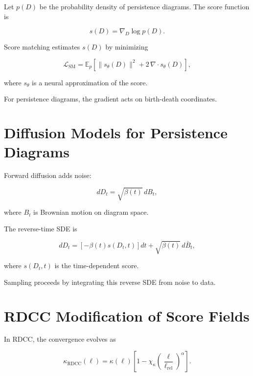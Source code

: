 \documentclass[11pt,a4paper]{article}
\begin{document}
Let $p(D)$ be the probability density of persistence diagrams. The score function 
is

\begin{equation}
    s(D)
    = \nabla_{D} \log p(D).
\end{equation}

Score matching estimates $s(D)$ by minimizing

\begin{equation}
    \mathcal{L}_{\mathrm{SM}}
    = \mathbb{E}_{p}
      \left[
        \| s_{\theta}(D) \|^{2}
        + 2 \, \nabla \cdot s_{\theta}(D)
      \right],
\end{equation}

where $s_{\theta}$ is a neural approximation of the score.

For persistence diagrams, the gradient acts on birth-death coordinates.
\section{Diffusion Models for Persistence Diagrams}

Forward diffusion adds noise:

\begin{equation}
    dD_{t}
    = \sqrt{\beta(t)} \, dB_{t},
\end{equation}

where $B_{t}$ is Brownian motion on diagram space.

The reverse-time SDE is

\begin{equation}
    dD_{t}
    = \left[
        - \beta(t) s(D_{t}, t)
      \right] dt
      + \sqrt{\beta(t)} \, d\bar{B}_{t},
\end{equation}

where $s(D_{t}, t)$ is the time-dependent score.

Sampling proceeds by integrating this reverse SDE from noise to data.
\section{RDCC Modification of Score Fields}

In RDCC, the convergence evolves as

\begin{equation}
    \kappa_{\mathrm{RDCC}}(\ell)
    = \kappa(\ell)
      \left[
        1 - \chi_{\kappa}
        \left(\frac{\ell}{\ell_{\mathrm{rel}}}\right)^{\alpha}
      \right].
\end{equation}
\end{document}
